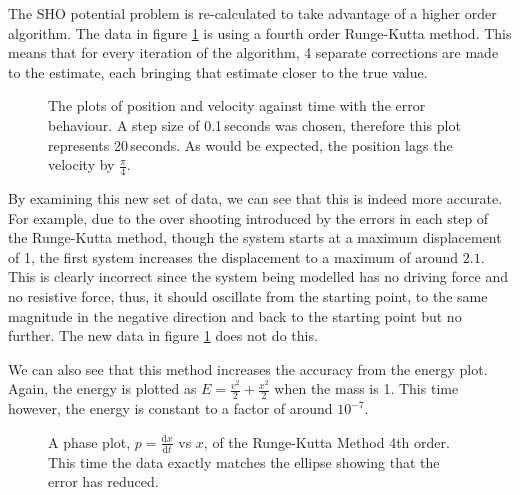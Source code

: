 \documentclass[11pt]{article} %
\newcommand{\inputTikZ}[1]{%
	}
\newcommand{\inputTikZ}[1]{%
		\beginpgfgraphicnamed{#1-external}%
		\endpgfgraphicnamed%
	}
\newcommand{\dx}[2]{\frac{\textrm{d} #1}{\textrm{d} #2}} %
\begin{document}
The SHO potential problem is re-calculated to take advantage of a higher order algorithm. The data in figure \ref{fig:runge4} is using a fourth order Runge-Kutta method. This means that for every iteration of the algorithm, 4 separate corrections are made to the estimate, each bringing that estimate closer to the true value.
\begin{figure}[ht]
	\centering
		\inputTikZ{Graph3}
	\caption{\label{fig:runge4}The plots of position and velocity against time with the error behaviour. A step size of 0.1\,seconds was chosen, therefore this plot represents 20\,seconds. As would be expected, the position lags the velocity by $\frac{\pi}{4}$.}
\end{figure}

By examining this new set of data, we can see that this is indeed more accurate. For example, due to the over shooting introduced by the errors in each step of the Runge-Kutta method, though the system starts at a maximum displacement of 1, the first system increases the displacement to a maximum of around $2.1$. This is clearly incorrect since the system being modelled has no driving force and no resistive force, thus, it should oscillate from the starting point, to the same magnitude in the negative direction and back to the starting point but no further. The new data in figure \ref{fig:runge4} does not do this. 

We can also see that this method increases the accuracy from the energy plot. Again, the energy is plotted as $E=\frac{v^2}{2} + \frac{x^2}{2}$ when the mass is 1. This time however, the energy is constant to a factor of around $10^{-7}$. 
\begin{figure}[ht]
	\centering
		\inputTikZ{Graph5}
	\caption{\label{fig:phase2}A phase plot, $p=\dx{x}{t}$ vs $x$, of the Runge-Kutta Method 4th order. This time the data exactly matches the ellipse showing that the error has reduced.}
\end{figure}
\end{document}

